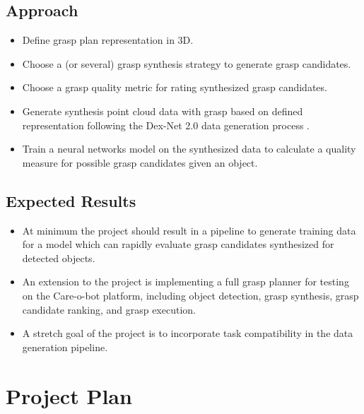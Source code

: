\documentclass[12pt]{article}
\begin{document}
    \subsection{Approach}
    \begin{itemize}
        \item Define grasp plan representation in 3D.
        \item Choose a (or several) grasp synthesis strategy to generate grasp candidates.
        \item Choose a grasp quality metric for rating synthesized grasp candidates.
        \item Generate synthesis point cloud data with grasp based on defined representation following the Dex-Net 2.0 data generation process \cite{mahler2017}.
        \item Train a neural networks model on the synthesized data to calculate a quality measure for possible grasp candidates given an object.
    \end{itemize}

    \subsection{Expected Results}
    \begin{itemize}
    	\item At minimum the project should result in a pipeline to generate training data for a model which can rapidly evaluate grasp candidates synthesized for detected objects.
    	\item An extension to the project is implementing a full grasp planner for testing on the Care-o-bot platform, including object detection, grasp synthesis, grasp candidate ranking, and grasp execution.
    	\item A stretch goal of the project is to incorporate task compatibility in the data generation pipeline.
    \end{itemize}


\section{Project Plan}

\end{document}
